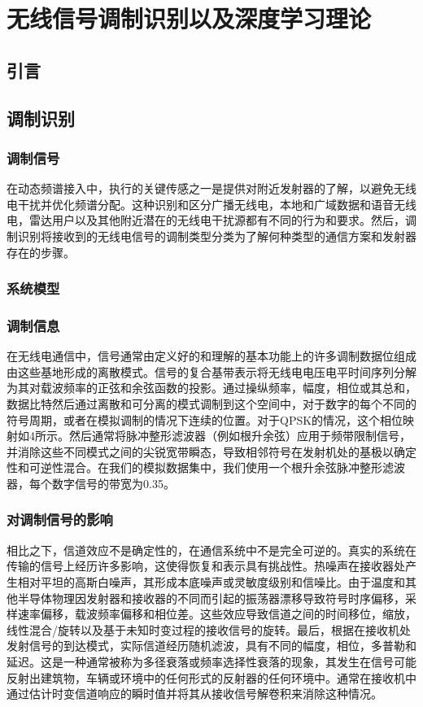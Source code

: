 
\chapter{无线信号调制识别以及深度学习理论}
\label{chap: mod_rec_deep_learning_theo}
\section{引言}
\section{调制识别}
\subsection{调制信号}
\label{sec:mod_signal}
在动态频谱接入中，执行的关键传感之一是提供对附近发射器的了解，以避免无线电干扰并优化频谱分配。这种识别和区分广播无线电，本地和广域数据和语音无线电，雷达用户以及其他附近潜在的无线电干扰源都有不同的行为和要求。然后，调制识别将接收到的无线电信号的调制类型分类为了解何种类型的通信方案和发射器存在的步骤。\par

\subsection{系统模型}

\subsection{调制信息}
在无线电通信中，信号通常由定义好的和理解的基本功能上的许多调制数据位组成由这些基地形成的离散模式。信号的复合基带表示将无线电电压电平时间序列分解为其对载波频率的正弦和余弦函数的投影。通过操纵频率，幅度，相位或其总和，数据比特然后通过离散和可分离的模式调制到这个空间中，对于数字的每个不同的符号周期，或者在模拟调制的情况下连续的位置。对于QPSK的情况，这个相位映射如4所示。然后通常将脉冲整形滤波器（例如根升余弦）应用于频带限制信号，并消除这些不同模式之间的尖锐宽带瞬态，导致相邻符号在发射机处的基极以确定性和可逆性混合。在我们的模拟数据集中，我们使用一个根升余弦脉冲整形滤波器，每个数字信号的带宽为0.35。\par
\subsection{对调制信号的影响}
相比之下，信道效应不是确定性的，在通信系统中不是完全可逆的。真实的系统在传输的信号上经历许多影响，这使得恢复和表示具有挑战性。热噪声在接收器处产生相对平坦的高斯白噪声，其形成本底噪声或灵敏度级别和信噪比。由于温度和其他半导体物理因发射器和接收器的不同而引起的振荡器漂移导致符号时序偏移，采样速率偏移，载波频率偏移和相位差。这些效应导致信道之间的时间移位，缩放，线性混合/旋转以及基于未知时变过程的接收信号的旋转。最后，根据在接收机处发射信号的到达模式，实际信道经历随机滤波，具有不同的幅度，相位，多普勒和延迟。这是一种通常被称为多径衰落或频率选择性衰落的现象，其发生在信号可能反射出建筑物，车辆或环境中的任何形式的反射器的任何环境中。通常在接收机中通过估计时变信道响应的瞬时值并将其从接收信号解卷积来消除这种情况。\par
